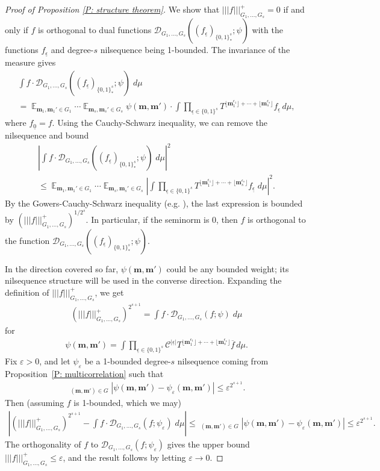 \documentclass[11pt]{amsart}
\theoremstyle{definition}
\DeclareMathOperator*{\oE}{\overline{\mathbb{E}}}
\DeclareMathOperator*{\E}{\mathbb{E}}
\newcommand{\CC}{{\mathcal C}}
\newcommand{\CD}{{\mathcal D}}
\newcommand{\bm}{{\mathbf{m}}}
\newcommand{\veps}{\varepsilon}
\newcommand{\eps}{\epsilon}
\newcommand{\ueps}{{\underline{\epsilon}}}
\newcommand{\nnorm}[1]{\lvert\!|\!| #1|\!|\!\rvert}
\newcommand{\1}{{\mathbf{1}}}
\newcommand{\abs}[1]{\mathopen{}\left| #1\mathclose{}\right|}
\newcommand{\sfloor}[1]{{\lfloor #1 \rfloor}}
\begin{document}
\begin{proof}[Proof of Proposition \ref{P: structure theorem}]
We show  that $\nnorm{f}_{G_1, \ldots, G_s}^+ = 0$ if and only if $f$ is orthogonal to dual functions $\CD_{G_1, \ldots, G_s}((f_\ueps)_{\{0,1\}^s_*}; \psi)$ with the functions $f_\ueps$ and degree-$s$ nilsequence being 1-bounded. The invariance of the measure gives
\begin{multline*}
     \int f \cdot \CD_{G_1, \ldots, G_s}((f_\ueps)_{\{0,1\}^s_*}; \psi)\;d\mu\\
     = \E_{\bm_1, \bm_1'\in G_1}\cdots \E_{\bm_s, \bm_s'\in G_s}\psi(\bm,\bm')\cdot\int \prod_{\ueps\in\{0,1\}^s}T^{\sfloor{\bm_1^{\eps_1}}+\cdots + \sfloor{\bm_s^{\eps_s}}} f_\ueps\, d\mu,
\end{multline*}
where $f_{\underline{0}} = f$.
    Using the Cauchy-Schwarz inequality, we can remove the nilsequence and bound
    \begin{multline*}
        \abs{\int f \cdot \CD_{G_1, \ldots, G_s}((f_\ueps)_{\{0,1\}^s_*}; \psi)\; d\mu}^2\\
        \leq  \E_{\bm_1, \bm_1'\in G_1}\cdots \E_{\bm_s, \bm_s'\in G_s}\abs{\int \prod_{\ueps\in\{0,1\}^s}T^{\sfloor{\bm_1^{\eps_1}}+\cdots + \sfloor{\bm_s^{\eps_s}}} f_\ueps\; d\mu}^2.
    \end{multline*}
    By the Gowers-Cauchy-Schwarz inequality (e.g. \cite[Lemma 3.3]{DKKST24}), the last expression is bounded by $(\nnorm{f}_{G_1, \ldots, G_s}^+)^{1/2^s}$. In particular, if the seminorm is 0, then $f$ is orthogonal to the function $\CD_{G_1, \ldots, G_s}((f_\ueps)_{\{0,1\}^s_*}; \psi)$.

    In the direction covered so far, $\psi(\bm,\bm')$ could be any bounded weight; its nilsequence structure will be used in the converse direction. Expanding the definition of $\nnorm{f}_{G_1, \ldots, G_s}^+$, we get 
    \begin{align*}
        (\nnorm{f}_{G_1, \ldots, G_s}^+)^{2^{s+1}} = \int f\cdot \CD_{G_1, \ldots, G_s}(f; \psi)\; d\mu
    \end{align*}
    for
    \begin{align*}
        \psi(\bm,\bm') = \int \prod_{\ueps\in\{0,1\}^s}\CC^{|\ueps|}T^{\sfloor{\bm_1^{\eps_1}}+\cdots + \sfloor{\bm_s^{\eps_s}}} \overline{f}\, d\mu.
    \end{align*}
    Fix $\veps>0$, and let $\psi_\veps$ be a 1-bounded degree-$s$ nilsequence coming from Proposition~\ref{P: multicorrelation} such that
    \begin{align*}
        \oE_{(\bm,\bm')\in G}\abs{\psi(\bm,\bm')-\psi_\veps(\bm,\bm')} \leq \veps^{2^{s+1}}.
    \end{align*}
    Then (assuming $f$ is 1-bounded, which we may)
    \begin{align*}
        \abs{(\nnorm{f}_{G_1, \ldots, G_s}^+)^{2^{s+1}} - \int f\cdot \CD_{G_1, \ldots, G_s}(f; \psi_\veps)\; d\mu}\leq \oE_{(\bm,\bm')\in G}\abs{\psi(\bm,\bm')-\psi_\veps(\bm,\bm')}\leq \veps^{2^{s+1}}.
    \end{align*}
    The orthogonality of $f$ to $\CD_{G_1, \ldots, G_s}(f; \psi_\veps)$ gives the upper bound $\nnorm{f}_{G_1, \ldots, G_s}^+\leq \veps$, and the result follows by letting $\veps\to 0$.
\end{proof}
\end{document}
